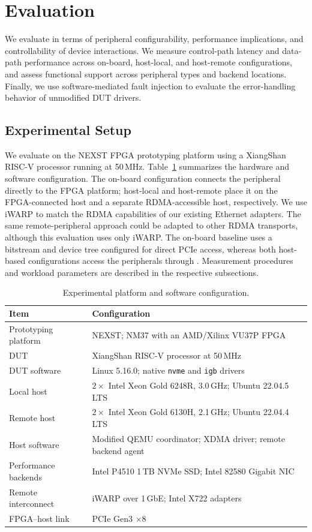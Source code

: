 \section{Evaluation}
\label{sec:evaluation}

We evaluate \sys in terms of peripheral configurability, performance
implications, and controllability of device interactions. We measure
control-path latency and data-path performance across on-board, host-local,
and host-remote configurations, and assess functional support across peripheral
types and backend locations. Finally, we use software-mediated fault injection
to evaluate the error-handling behavior of unmodified DUT drivers.

\subsection{Experimental Setup}

We evaluate \sys on the NEXST FPGA prototyping platform using a XiangShan
RISC-V processor running at 50\,MHz. Table~\ref{tab:platform} summarizes the
hardware and software configuration. The on-board configuration connects the
peripheral directly to the FPGA platform; host-local and host-remote place it
on the FPGA-connected host and a separate RDMA-accessible host, respectively.
We use iWARP to match the RDMA capabilities of our existing Ethernet adapters.
The same remote-peripheral approach could be adapted to other RDMA transports,
although this evaluation uses only iWARP.
The on-board baseline uses a bitstream and device tree configured for direct
PCIe access, whereas both host-based configurations access the peripherals
through \sys. Measurement procedures and workload parameters are described
in the respective subsections.

\begin{table}[t]
\centering
\caption{Experimental platform and software configuration.}
\label{tab:platform}
\small
\begin{tabular}{@{}p{}p{}@{}}
\toprule
Item & Configuration \\
\midrule
Prototyping platform & NEXST; NM37 with an AMD/Xilinx VU37P FPGA \\
DUT & XiangShan RISC-V processor at 50\,MHz \\
DUT software & Linux 5.16.0; native \texttt{nvme} and \texttt{igb} drivers \\
Local host & $2\times$ Intel Xeon Gold 6248R, 3.0\,GHz; Ubuntu 22.04.5 LTS \\
Remote host & $2\times$ Intel Xeon Gold 6130H, 2.1\,GHz; Ubuntu 22.04.4 LTS \\
Host software & Modified QEMU coordinator; XDMA driver; remote backend agent \\
Performance backends & Intel P4510 1\,TB NVMe SSD; Intel 82580 Gigabit NIC \\
Remote interconnect & iWARP over 1\,GbE; Intel X722 adapters \\
FPGA--host link & PCIe Gen3 $\times8$ \\
\bottomrule
\end{tabular}
\end{table}

